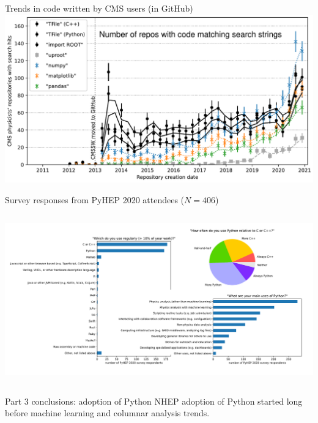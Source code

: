 \documentclass[aspectratio=169]{beamer}
\begin{document}
\begin{frame}{Trends in code written by CMS users (in GitHub)}
\vspace{0.25 cm}
\includegraphics[width=\linewidth]{PLOTS/lhlhc-github-overlay-lin-paper.pdf}
\end{frame}

\begin{frame}{Survey responses from PyHEP 2020 attendees ($N=406$)}
\vspace{0.25 cm}
\begin{columns}
\includegraphics[width=\linewidth]{PLOTS/pyhep2020-survey-paper.pdf}
\end{columns}
\end{frame}

\begin{frame}{Part 3 conclusions: adoption of Python}
\large
\vspace{0.5 cm}
NHEP adoption of Python started long before machine learning and columnar analysis trends.

\vspace{0.75 cm}

\vspace{0.75 cm}
\end{frame}
\end{document}

